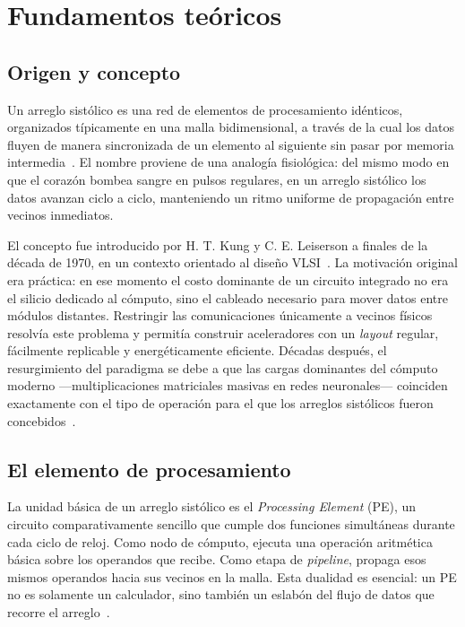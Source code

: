 \documentclass[conference]{IEEEtran}
\begin{document}
\section{Fundamentos teóricos}

\subsection{Origen y concepto}

Un arreglo sistólico es una red de elementos de procesamiento idénticos, organizados típicamente en una malla bidimensional, a través de la cual los datos fluyen de manera sincronizada de un elemento al siguiente sin pasar por memoria intermedia~\cite{puscasu2024sa}. El nombre proviene de una analogía fisiológica: del mismo modo en que el corazón bombea sangre en pulsos regulares, en un arreglo sistólico los datos avanzan ciclo a ciclo, manteniendo un ritmo uniforme de propagación entre vecinos inmediatos.

El concepto fue introducido por H. T. Kung y C. E. Leiserson a finales de la década de 1970, en un contexto orientado al diseño VLSI~\cite{liao2025nn}. La motivación original era práctica: en ese momento el costo dominante de un circuito integrado no era el silicio dedicado al cómputo, sino el cableado necesario para mover datos entre módulos distantes. Restringir las comunicaciones únicamente a vecinos físicos resolvía este problema y permitía construir aceleradores con un \textit{layout} regular, fácilmente replicable y energéticamente eficiente. Décadas después, el resurgimiento del paradigma se debe a que las cargas dominantes del cómputo moderno ---multiplicaciones matriciales masivas en redes neuronales--- coinciden exactamente con el tipo de operación para el que los arreglos sistólicos fueron concebidos~\cite{liao2025nn}.

\subsection{El elemento de procesamiento}

La unidad básica de un arreglo sistólico es el \textit{Processing Element} (PE), un circuito comparativamente sencillo que cumple dos funciones simultáneas durante cada ciclo de reloj. Como nodo de cómputo, ejecuta una operación aritmética básica sobre los operandos que recibe. Como etapa de \textit{pipeline}, propaga esos mismos operandos hacia sus vecinos en la malla. Esta dualidad es esencial: un PE no es solamente un calculador, sino también un eslabón del flujo de datos que recorre el arreglo~\cite{puscasu2024sa}.
\end{document}
